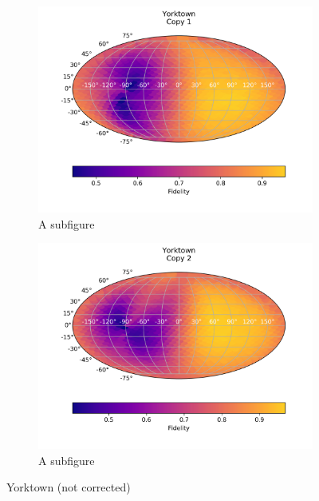 \begin{figure}[H]
    \centering
    \begin{subfigure}{.5\textwidth}
      \centering
      \includegraphics[width=\textwidth]{Figures/Economical/IBM/FullSphere/results_ibmqx2.txt_copy1.png}
      \caption{A subfigure}
      \label{fig:ec_yorktown_sphere_1}
    \end{subfigure}%
    \begin{subfigure}{.5\textwidth}
      \centering
      \includegraphics[width=\textwidth]{Figures/Economical/IBM/FullSphere/results_ibmqx2.txt_copy2.png}
      \caption{A subfigure}
      \label{fig:ec_yorktown_sphere_2}
    \end{subfigure}
    \caption{Yorktown (not corrected)}
    \label{fig:ec_yorktown_sphere}
\end{figure}

